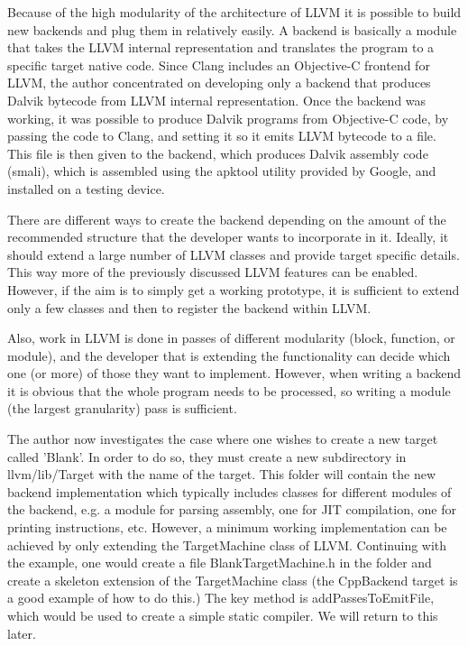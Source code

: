 \documentclass[parskip]{cs4rep}
\begin{document}
Because of the high modularity of the architecture of LLVM it is possible to build new backends and plug them in relatively easily. A backend is basically a module that takes the LLVM internal representation and translates the program to a specific target native code. Since Clang includes an Objective-C frontend for LLVM, the author concentrated on developing only a backend that produces Dalvik bytecode from LLVM internal representation. Once the backend was working, it was possible to produce Dalvik programs from Objective-C code, by passing the code to Clang, and setting it so it emits LLVM bytecode to a file. This file is then given to the backend, which produces Dalvik assembly code (smali), which is assembled using the apktool utility provided by Google, and installed on a testing device.

There are different ways to create the backend depending on the amount of the recommended structure that the developer wants to incorporate in it. Ideally, it should extend a large number of LLVM classes and provide target specific details\cite{P8}. This way more of the previously discussed LLVM features can be enabled. However, if the aim is to simply get a working prototype, it is sufficient to extend only a few classes and then to register the backend within LLVM.

Also, work in LLVM is done in passes of different modularity (block, function, or module), and the developer that is extending the functionality can decide which one (or more) of those they want to implement. However, when writing a backend it is obvious that the whole program needs to be processed, so writing a module (the largest granularity) pass is sufficient.

The author now investigates the case where one wishes to create a new target called 'Blank'. In order to do so, they must create a new subdirectory in llvm/lib/Target with the name of the target. This folder will contain the new backend implementation which typically includes classes for different modules of the backend, e.g. a module for parsing assembly, one for JIT compilation, one for printing instructions, etc. However, a minimum working implementation can be achieved by only extending the TargetMachine class of LLVM. Continuing with the example, one would create a file BlankTargetMachine.h in the folder and create a skeleton extension of the TargetMachine class (the CppBackend target is a good example of how to do this.) The key method is addPassesToEmitFile, which would be used to create a simple static compiler. We will return to this later.
\end{document}
